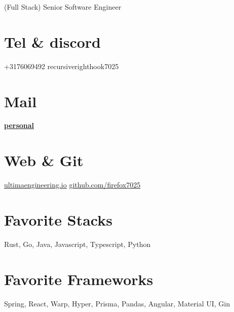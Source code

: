\documentclass[]{friggeri-cv}
\begin{document}
      {(Full Stack) Senior Software Engineer}
      

\begin{aside}
  \section{Tel \& discord}
    +3176069492
    recursiverighthook7025
    ~
  \section{Mail}
    \href{mailto:alexandermontgomery95@gmail.com}{\textbf{personal}}
    ~
  \section{Web \& Git}
    \href{http://www.ultimaengineering.io}{ultimaengineering.io}
    \href{https://github.com/firefox7025}{github.com/firefox7025}
  \section{Favorite Stacks}
    Rust, Go, Java, Javascript, Typescript, Python
    \section{Favorite Frameworks}
    Spring, React, Warp, Hyper, Prisma, Pandas, Angular, Material UI, Gin
\end{aside}
\end{document}
